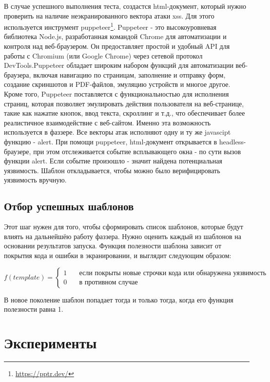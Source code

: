 \documentclass[a4paper]{article}
\begin{document}
В случае успешного выполнения теста, создастся html-документ, который нужно проверить на наличие неэкранированного вектора атаки xss. Для этого используется инструмент puppeteer\footnote{\href{https://pptr.dev/}{https://pptr.dev/}}. Puppeteer - это высокоуровневая библиотека Node.js, разработанная командой Chrome для автоматизации и контроля над веб-браузером. Он предоставляет простой и удобный API для работы с Chromium (или Google Chrome) через сетевой протокол DevTools.Puppeteer обладает широким набором функций для автоматизации веб-браузера, включая навигацию по страницам, заполнение и отправку форм, создание скриншотов и PDF-файлов, эмуляцию устройств и многое другое. Кроме того, Puppeteer поставляется с функциональностью для исполнения страниц, которая позволяет эмулировать действия пользователя на веб-странице, такие как нажатие кнопок, ввод текста, скроллинг и т.д., что обеспечивает более реалистичное взаимодействие с веб-сайтом. Именно эта возможность используется в фаззере. Все векторы атак исполняют одну и ту же javascipt функцию - alert. При помощи puppeteer, html-документ открывается в headless-браузере, при этом отслеживается событие всплывающего окна - по сути вызов функции alert. Если событие произошло - значит найдена потенциальная уязвимость. Шаблон откладывается, чтобы можно было верифицировать уязвимость вручную. 

\subsection{Отбор успешных шаблонов}

Этот шаг нужен для того, чтобы сформировать список шаблонов, которые будут влиять на дальнейшёю работу фаззера. Нужно оценить каждый из шаблонов на основании результатов запуска. Функция полезности шаблона зависит от покрытия кода и  ошибки в экранировании, и выглядит следующим образом:

\[
f(template) = 
\begin{cases}
    1 & \quad \text{если покрыты новые строчки кода или обнаружена уязвимость}\\
    0 & \quad \text{в противном случае}
\end{cases}
\]

В новое поколение шаблон попадает тогда и только тогда, когда его функция полезности равна 1.

\newpage
\section{Эксперименты}
\indent
\end{document}
